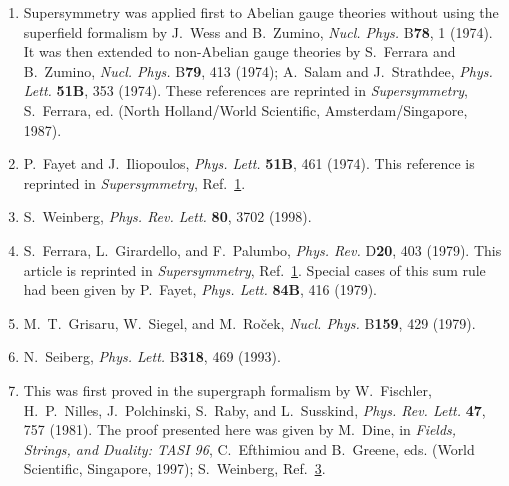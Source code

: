 


\begin{enumerate}
  \item {}\label{ch27-ref-1}
  Supersymmetry was applied first to Abelian gauge theories without
  using the superfield formalism by J.~Wess and B.~Zumino,
  \textit{Nucl. Phys.} B\textbf{78}, 1 (1974). It was then extended to
  non-Abelian gauge theories by S.~Ferrara and B.~Zumino,
  \textit{Nucl. Phys.} B\textbf{79}, 413 (1974); A.~Salam and
  J.~Strathdee, \textit{Phys. Lett.} \textbf{51B}, 353 (1974). These
  references are reprinted in \textit{Supersymmetry}, S.~Ferrara, ed.
  (North Holland/World Scientific, Amsterdam/Singapore, 1987).

  \item {}\label{ch27-ref-2}
  P.~Fayet and J.~Iliopoulos, \textit{Phys. Lett.} \textbf{51B}, 461
  (1974). This reference is reprinted in \textit{Supersymmetry},
  Ref.~\hyperref[ch27-ref-1]{1}.

  \item {}\label{ch27-ref-3}
  S.~Weinberg, \textit{Phys. Rev. Lett.} \textbf{80}, 3702 (1998).

  \item {}\label{ch27-ref-4}
  S.~Ferrara, L.~Girardello, and F.~Palumbo, \textit{Phys. Rev.}
  D\textbf{20}, 403 (1979). This article is reprinted in
  \textit{Supersymmetry}, Ref.~\hyperref[ch27-ref-1]{1}. Special cases
  of this sum rule had been given by P.~Fayet, \textit{Phys. Lett.}
  \textbf{84B}, 416 (1979).

  \item {}\label{ch27-ref-5}
  M.~T.~Grisaru, W.~Siegel, and M.~Ro\v{c}ek, \textit{Nucl. Phys.}
  B\textbf{159}, 429 (1979).

  \item {}\label{ch27-ref-6}
  N.~Seiberg, \textit{Phys. Lett.} B\textbf{318}, 469 (1993).

  \item {}\label{ch27-ref-7}
  This was first proved in the supergraph formalism by W.~Fischler,
  H.~P.~Nilles, J.~Polchinski, S.~Raby, and L.~Susskind,
  \textit{Phys. Rev. Lett.} \textbf{47}, 757 (1981). The proof presented
  here was given by M.~Dine, in \textit{Fields, Strings, and Duality:
  TASI 96}, C.~Efthimiou and B.~Greene, eds. (World Scientific,
  Singapore, 1997); S.~Weinberg, Ref.~\hyperref[ch27-ref-3]{3}.


\end{enumerate}
